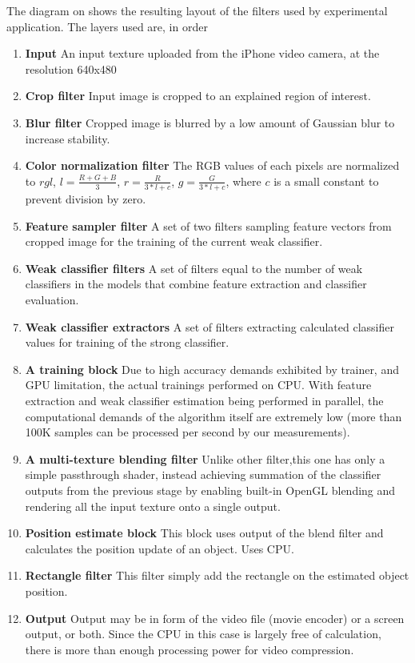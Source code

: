 The diagram on  shows the resulting layout of the filters used by experimental application. The layers used are, in order
\begin{enumerate}
\item {\bf Input} An input texture uploaded from the iPhone video camera, at the resolution 640x480
\item {\bf Crop filter} Input image is cropped to an explained region of interest.
\item {\bf Blur filter} Cropped image is blurred by a low amount of Gaussian blur to increase stability.
\item {\bf Color normalization filter} The RGB values of each pixels are normalized to $rgl$, $l=\frac{R+G+B}{3}$, $r=\frac{R}{3*l+c}$, $g=\frac{G}{3*l+c}$, where $c$ is a small constant to prevent division by zero.
\item {\bf Feature sampler filter} A set of two filters sampling feature vectors from cropped image for the training of the current weak classifier. 
\item {\bf Weak classifier filters} A set of filters equal to the number of weak classifiers in the models that combine feature extraction and classifier evaluation.
\item {\bf Weak classifier extractors} A set of filters extracting calculated classifier values for training of the strong classifier.
\item {\bf A training block} Due to high accuracy demands exhibited by trainer, and GPU limitation, the actual trainings performed on CPU. With feature extraction and weak classifier estimation being performed in parallel, the computational demands of the algorithm itself are extremely low (more than 100K samples can be processed per second by our measurements). 
\item {\bf A multi-texture blending filter} Unlike other filter,this one has only a simple passthrough shader, instead achieving summation of the classifier outputs from the previous stage by  enabling built-in OpenGL blending and rendering all the input texture onto a single output. 
\item {\bf Position estimate block} This block uses output of the blend filter and calculates the position update of an object. Uses CPU. 
\item {\bf Rectangle filter} This filter simply add the rectangle on the estimated object position. 
\item {\bf Output} Output may be in form of the video file (movie encoder) or a screen output, or both. Since the CPU in this case is largely free of calculation, there is more than enough processing power for video compression. 
\end{enumerate}

